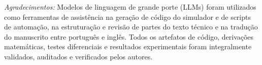 \documentclass[conference]{IEEEtran}
\begin{document}
\emph{Agradecimentos:} Modelos de linguagem de grande porte (LLMs) foram utilizados como ferramentas de assist\^encia na gera\c{c}\~ao de c\'odigo do simulador e de scripts de automa\c{c}\~ao, na estrutura\c{c}\~ao e revis\~ao de partes do texto t\'ecnico e na tradu\c{c}\~ao do manuscrito entre portugu\^es e ingl\^es. Todos os artefatos de c\'odigo, deriva\c{c}\~oes matem\'aticas, testes diferenciais e resultados experimentais foram integralmente validados, auditados e verificados pelos autores.



\end{document}
